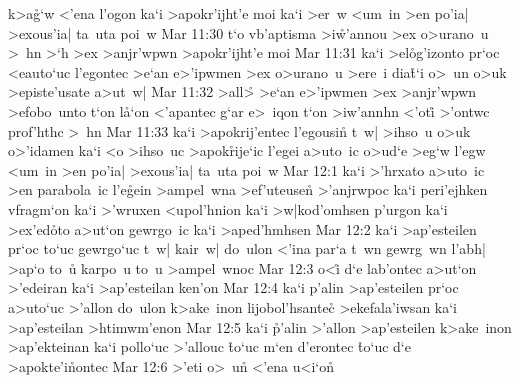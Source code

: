 k>a\r{g}`w
<'ena
l'ogon
ka`i
>apokr'ijht'e
moi
ka`i
>er~w
<um~in
>en
po'ia|
>exous'ia|
ta~uta
poi~w\bibvsend
\vs Mar 11:30
t`o
vb'aptisma
>i\r{w}'annou
>ex
o>urano~u
>~hn
>`h
>ex
>anjr'wpwn
>apokr'ijht'e
moi\bibvsend
\vs Mar 11:31
ka`i
>el\r{o}g'izonto
pr`oc
<eauto`uc
l'egontec
>e`an
e>'ipwmen
>ex
o>urano~u
>ere~i
dia\r{t}`i
o>~un
o>uk
>episte'usate
a>ut~w|\bibvsend
\vs Mar 11:32
>all>\r{}
>e`an
e>'ipwmen
>ex
>anjr'wpwn
>efobo~unto
t`on
l\r{a}`on
<'apantec
g`ar
e>~iqon
t`on
>iw'annhn
<'oti\r{}
>'ontwc
prof'hthc
>~hn\bibvsend
\vs Mar 11:33
ka`i
>apokrij'entec
l'egousin\r{}
t~w|
>ihso~u
o>uk
o>'idamen
ka`i
<o
>ihso~uc
>apok\r{r}ije`ic
l'egei
a>uto~ic
o>ud`e
>eg`w
l'egw
<um~in
>en
po'ia|
>exous'ia|
ta~uta
poi~w\bibvsend
\vs Mar 12:1
ka`i
>'hrxato
a>uto~ic
>en
parabola~ic
l'e\r{g}ein
>ampel~wna
>ef'uteusen\r{}
>'anjrwpoc
ka`i
peri'ejhken
vfragm`on
ka`i
>'wruxen
<upol'hnion
ka`i
>w|kod'omhsen
p'urgon
ka`i
>ex'ed\r{o}to
a>ut`on
gewrgo~ic
ka`i
>aped'hmhsen\bibvsend
\vs Mar 12:2
ka`i
>ap'esteilen
pr`oc
to`uc
gewrgo`uc
t~w|
kair~w|
do~ulon
<'ina
par`a
t~wn
gewrg~wn
l'abh|
>ap`o
to~u\r{}
karpo~u
to~u
>ampel~wnoc\bibvsend
\vs Mar 12:3
o<i\r{}
d`e
lab'ontec
a>ut`on
>'edeiran
ka`i
>ap'esteilan
ken'on\bibvsend
\vs Mar 12:4
ka`i
p'alin
>ap'esteilen
pr`oc
a>uto`uc
>'allon
do~ulon
k>ake~inon
lijobol'hsantec\r{}
>ekefala'iwsan
ka`i
>ap'esteilan
>htimwm'enon\bibvsend
\vs Mar 12:5
ka`i
\r{p}'alin
>'allon
>ap'esteilen
k>ake~inon
>ap'ekteinan
ka`i
pollo`uc
>'allouc
\r{t}o`uc
m`en
d'erontec
\r{t}o`uc
d`e
>apokte'i\r{n}ontec\bibvsend
{}
\vs Mar 12:6
>'eti
o>~u\r{n}
<'ena
u<i`on\r{}
